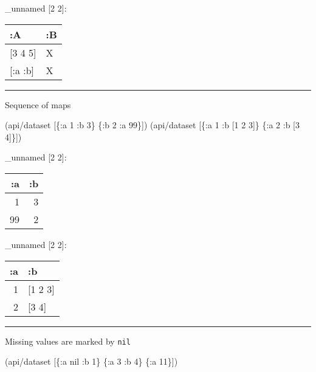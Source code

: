 \documentclass[]{article}
\newenvironment{Shaded}{\begin{snugshade}}{\end{snugshade}}
\newcommand{\DecValTok}[1]{\textcolor[rgb]{0.00,0.00,0.81}{#1}}
\newcommand{\VariableTok}[1]{\textcolor[rgb]{0.00,0.00,0.00}{#1}}
\newcommand{\AttributeTok}[1]{\textcolor[rgb]{0.77,0.63,0.00}{#1}}
\newcommand{\NormalTok}[1]{#1}
\begin{document}
\_unnamed {[}2 2{]}:

\begin{longtable}[]{@{}ll@{}}
\toprule
:A & :B\tabularnewline
\midrule
\endhead
{[}3 4 5{]} & X\tabularnewline
{[}:a :b{]} & X\tabularnewline
\bottomrule
\end{longtable}

\begin{center}\rule{0.5\linewidth}{0.5pt}\end{center}

Sequence of maps

\begin{Shaded}
\begin{Highlighting}[]
\NormalTok{(api/dataset [\{}\AttributeTok{:a} \DecValTok{1} \AttributeTok{:b} \DecValTok{3}\NormalTok{\} \{}\AttributeTok{:b} \DecValTok{2} \AttributeTok{:a} \DecValTok{99}\NormalTok{\}])}
\NormalTok{(api/dataset [\{}\AttributeTok{:a} \DecValTok{1} \AttributeTok{:b}\NormalTok{ [}\DecValTok{1} \DecValTok{2} \DecValTok{3}\NormalTok{]\} \{}\AttributeTok{:a} \DecValTok{2} \AttributeTok{:b}\NormalTok{ [}\DecValTok{3} \DecValTok{4}\NormalTok{]\}])}
\end{Highlighting}
\end{Shaded}

\_unnamed {[}2 2{]}:

\begin{longtable}[]{@{}rr@{}}
\toprule
:a & :b\tabularnewline
\midrule
\endhead
1 & 3\tabularnewline
99 & 2\tabularnewline
\bottomrule
\end{longtable}

\_unnamed {[}2 2{]}:

\begin{longtable}[]{@{}rl@{}}
\toprule
:a & :b\tabularnewline
\midrule
\endhead
1 & {[}1 2 3{]}\tabularnewline
2 & {[}3 4{]}\tabularnewline
\bottomrule
\end{longtable}

\begin{center}\rule{0.5\linewidth}{0.5pt}\end{center}

Missing values are marked by \texttt{nil}

\begin{Shaded}
\begin{Highlighting}[]
\NormalTok{(api/dataset [\{}\AttributeTok{:a} \VariableTok{nil} \AttributeTok{:b} \DecValTok{1}\NormalTok{\} \{}\AttributeTok{:a} \DecValTok{3} \AttributeTok{:b} \DecValTok{4}\NormalTok{\} \{}\AttributeTok{:a} \DecValTok{11}\NormalTok{\}])}
\end{Highlighting}
\end{Shaded}
\end{document}

